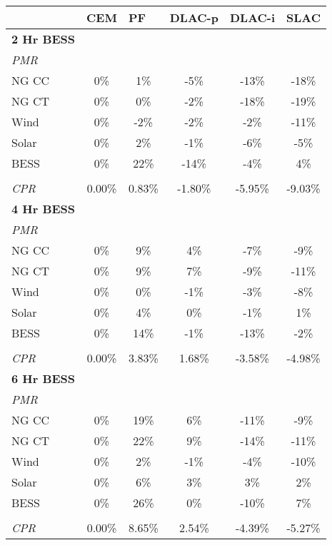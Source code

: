 \begin{table}[]
\centering
\begin{tabular}{lccccc}
\hline
& \multicolumn{1}{l}{\textbf{CEM}} & \multicolumn{1}{l}{\textbf{PF}} & \multicolumn{1}{l}{\textbf{DLAC-p}} & \multicolumn{1}{l}{\textbf{DLAC-i}} & \multicolumn{1}{l}{\textbf{SLAC}} \\ \hline
\textbf{2 Hr BESS} &  &  &  &  & \\
 \quad \textit{PMR}  &  &  &  &  & \\
\qquad NG CC & 0\% & 1\% & -5\% & -13\% & -18\% \\
\qquad NG CT & 0\% & 0\% & -2\% & -18\% & -19\% \\
\qquad Wind & 0\% & -2\% & -2\% & -2\% & -11\% \\
\qquad Solar & 0\% & 2\% & -1\% & -6\% & -5\% \\
\qquad BESS & 0\% & 22\% & -14\% & -4\% & 4\% \\
&  &  &  &  & \\
\quad \textit{CPR} & 0.00\% & 0.83\% & -1.80\% & -5.95\% & -9.03\% \\\hline
\textbf{4 Hr BESS} &  &  &  &  & \\
 \quad \textit{PMR}  &  &  &  &  & \\
\qquad NG CC & 0\% & 9\% & 4\% & -7\% & -9\% \\
\qquad NG CT & 0\% & 9\% & 7\% & -9\% & -11\% \\
\qquad Wind & 0\% & 0\% & -1\% & -3\% & -8\% \\
\qquad Solar & 0\% & 4\% & 0\% & -1\% & 1\% \\
\qquad BESS & 0\% & 14\% & -1\% & -13\% & -2\% \\
&  &  &  &  & \\
\quad \textit{CPR} & 0.00\% & 3.83\% & 1.68\% & -3.58\% & -4.98\% \\\hline
\textbf{6 Hr BESS} &  &  &  &  & \\
 \quad \textit{PMR}  &  &  &  &  & \\
\qquad NG CC & 0\% & 19\% & 6\% & -11\% & -9\% \\
\qquad NG CT & 0\% & 22\% & 9\% & -14\% & -11\% \\
\qquad Wind & 0\% & 2\% & -1\% & -4\% & -10\% \\
\qquad Solar & 0\% & 6\% & 3\% & 3\% & 2\% \\
\qquad BESS & 0\% & 26\% & 0\% & -10\% & 7\% \\
&  &  &  &  & \\
\quad \textit{CPR} & 0.00\% & 8.65\% & 2.54\% & -4.39\% & -5.27\% \\\hline

\end{tabular}
\end{table}
